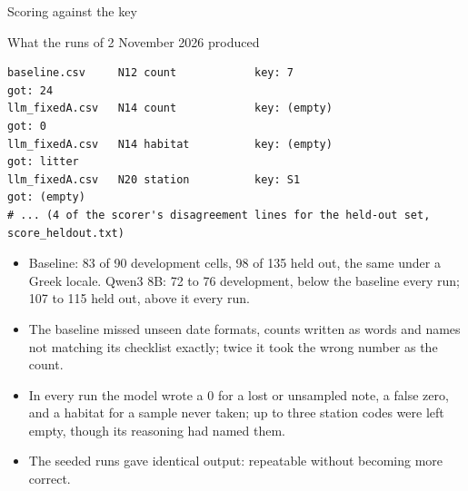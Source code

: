 \documentclass[11pt,aspectratio=169]{beamer}
\begin{document}
\begin{frame}{Scoring against the key}
\end{frame}

\begin{frame}[fragile]{What the runs of 2 November 2026 produced}
  \begin{lstlisting}[basicstyle=\ttfamily\scriptsize]
baseline.csv     N12 count            key: 7                            got: 24
llm_fixedA.csv   N14 count            key: (empty)                      got: 0
llm_fixedA.csv   N14 habitat          key: (empty)                      got: litter
llm_fixedA.csv   N20 station          key: S1                           got: (empty)
# ... (4 of the scorer's disagreement lines for the held-out set, score_heldout.txt)
  \end{lstlisting}
  \small
  \begin{itemize}
    \item Baseline: 83 of 90 development cells, 98 of 135 held out, the same under a Greek locale. Qwen3 8B: 72 to 76 development, below the baseline every run; 107 to 115 held out, above it every run.
    \item The baseline missed unseen date formats, counts written as words and names not matching its checklist exactly; twice it took the wrong number as the count.
    \item In every run the model wrote a 0 for a lost or unsampled note, a false zero, and a habitat for a sample never taken; up to three station codes were left empty, though its reasoning had named them.
    \item The seeded runs gave identical output: repeatable without becoming more correct.
  \end{itemize}
\end{frame}
\end{document}
